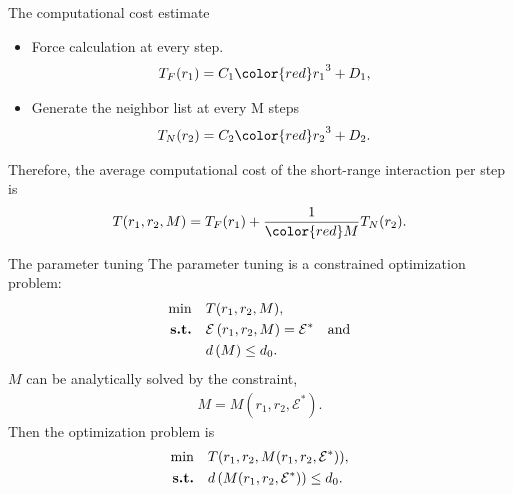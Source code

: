 \documentclass{beamer}
\newcommand{\redc}[1]{{\color{red} #1}}
\newcommand{\bluec}[1]{{\color{blue} #1}}
\begin{document}
\begin{frame}{The computational cost estimate}
  \begin{itemize}\itemsep -10pt
  \item Force calculation at every step.
    \bluec{
      \begin{align*}
        T_{F}(r_1) &= C_1 \redc{r_1}^3 + D_1,
      \end{align*}
    }
  \item Generate the neighbor list at every M steps
    \bluec{
      \begin{align*}
        T_{N}(r_2) &= C_2 \redc{r_2}^3 + D_2.
      \end{align*}
    }
  \end{itemize}
  \vskip -10pt
  Therefore, the average computational cost of the short-range
  interaction per step is
  \bluec{
  \begin{align*}
    T (r_1, r_2, M) = T_F(r_1) + \frac1{\redc{M}}T_{N}(r_2).
  \end{align*}
  }
\end{frame}

\begin{frame}{The parameter tuning}
  The parameter tuning is a constrained optimization problem:
  \bluec{
    \begin{align*}
      \min\quad
      & T(r_1, r_2, M), \\*
      \textrm{\textbf{s.t.}}\quad
      & \mathcal E\,(r_1, r_2, M) = \mathcal E^\ast \quad \textrm{and} \\*
      & d\,(M) \leq d_0.
    \end{align*}
  }
  $M$ can be analytically solved by the constraint,
  \bluec{\begin{align*}
      M = M(r_1, r_2, \mathcal E^\ast).
    \end{align*}}
  Then the optimization problem is
    \bluec{\begin{align*}
    \min\quad
    &T(r_1, r_2, M(r_1, r_2, \mathcal E^\ast)), \\*
    \textrm{\textbf{s.t.}}\quad
    &d\,(M(r_1, r_2,\mathcal E^\ast)) \leq d_0.
  \end{align*}}
\end{frame}
\end{document}
